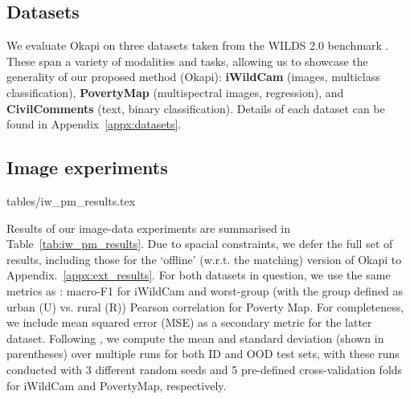 \subsection{Datasets}\label{sec:exps_datasets} We evaluate Okapi on three datasets taken from the
WILDS 2.0 benchmark \cite{SagWeiLeeGaoetal22}. These span a variety of modalities and tasks,
allowing us to showcase the generality of our proposed method (Okapi): \textbf{iWildCam} (images,
multiclass classification), \textbf{PovertyMap} (multispectral images, regression), and
\textbf{CivilComments} (text, binary classification). 
Details of each dataset can be found in Appendix~\ref{appx:datasets}.

\subsection{Image experiments}

{tables/iw_pm_results.tex}

Results of our image-data experiments are summarised in Table~\ref{tab:iw_pm_results}. Due to spacial 
constraints, we defer the full set of results, including those for the `offline' (w.r.t. the
matching) version of Okapi to Appendix.~\ref{appx:ext_results}.
For both datasets in question, we use the same metrics as \cite{SagWeiLeeGaoetal22}: macro-F1 for
iWildCam and worst-group (with the group defined as urban (U) vs. rural (R)) Pearson correlation
for Poverty Map. For completeness, we include mean squared error (MSE) as a secondary metric for
the latter dataset. Following \cite{SagWeiLeeGaoetal22}, we compute the mean and standard deviation
(shown in parentheses) over multiple runs for both ID and OOD test sets, with these runs conducted
with 3 different random seeds and 5 pre-defined cross-validation folds for iWildCam and
PovertyMap, respectively.

